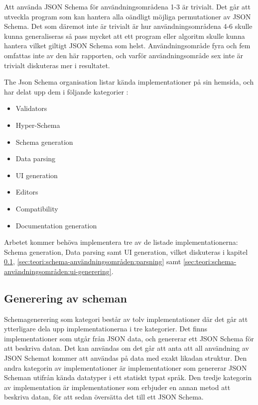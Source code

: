 \noindent
Att använda JSON Schema för användningsområdena 1-3 är trivialt. Det går att utveckla program som kan hantera alla oändligt möjliga permutationer av JSON Schema. Det som däremot inte är trivialt är hur användningsområdena 4-6 skulle kunna generaliseras så pass mycket att ett program eller algoritm skulle kunna hantera vilket giltigt JSON Schema som helst. Användningsområde fyra och fem omfattas inte av den här rapporten, och varför användningsområde sex inte är trivialt diskuteras mer i resultatet.

The Json Schema organisation listar kända implementationer på sin hemsida, och har delat upp dem i följande kategorier \cite{TheJSONSchemaorganisation}:
\begin{itemize}
	\item Validators
	\item Hyper-Schema
	\item Schema generation
	\item Data parsing
	\item UI generation
	\item Editors
	\item Compatibility
	\item Documentation generation
\end{itemize}
\noindent
Arbetet kommer behöva implementera tre av de listade implementationerna: Schema generation, Data parsing samt UI generation, vilket diskuteras i kapitel \ref{sec:teori:schema-användningsområden:generering}, \ref{sec:teori:schema-användningsområden:parsning} samt \ref{sec:teori:schema-användningsområden:ui-generering}.

\subsection{Generering av scheman}
\label{sec:teori:schema-användningsområden:generering}
Schemagenerering som kategori består av tolv implementationer där det går att ytterligare dela upp implementationerna i tre kategorier. Det finns implementationer som utgår från JSON data, och genererar ett JSON Schema för att beskriva datan. Det kan användas om det går att anta att all användning av JSON Schemat kommer att användas på data med exakt likadan struktur. Den andra kategorin av implementationer är implementationer som genererar JSON Scheman utifrån kända datatyper i ett statiskt typat språk. Den tredje kategorin av implementation är implementationer som erbjuder en annan metod att beskriva datan, för att sedan översätta det till ett JSON Schema. \cite{TheJSONSchemaorganisation}


